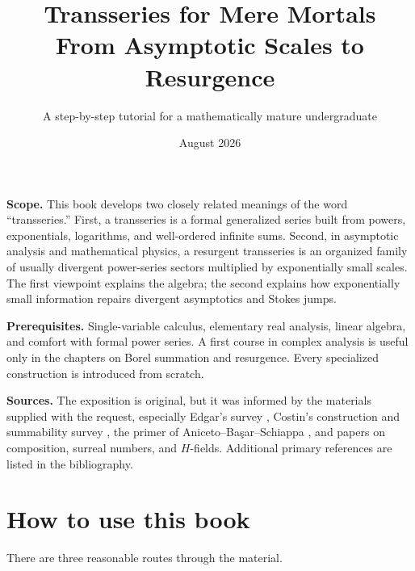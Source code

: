 \documentclass[11pt,oneside]{book}
\title{\Huge\bfseries Transseries for Mere Mortals\\[0.7em]
\Large From Asymptotic Scales to Resurgence}
\author{A step-by-step tutorial for a mathematically mature undergraduate}
\date{August 2026}
\theoremstyle{definition}
\theoremstyle{remark}
\begin{document}
\frontmatter
\hypersetup{pageanchor=false}
\maketitle
\hypersetup{pageanchor=true}

\thispagestyle{empty}
\begin{center}
\begin{minipage}{0.88\textwidth}
\small
\textbf{Scope.} This book develops two closely related meanings of the word
``transseries.'' First, a transseries is a formal generalized series built from
powers, exponentials, logarithms, and well-ordered infinite sums. Second, in
asymptotic analysis and mathematical physics, a resurgent transseries is an
organized family of usually divergent power-series sectors multiplied by
exponentially small scales. The first viewpoint explains the algebra; the second
explains how exponentially small information repairs divergent asymptotics and
Stokes jumps.

\medskip
\textbf{Prerequisites.} Single-variable calculus, elementary real analysis,
linear algebra, and comfort with formal power series. A first course in complex
analysis is useful only in the chapters on Borel summation and resurgence. Every
specialized construction is introduced from scratch.

\medskip
\textbf{Sources.} The exposition is original, but it was informed by the
materials supplied with the request, especially Edgar's survey
\cite{EdgarBeginners}, Costin's construction and summability survey
\cite{CostinTopological}, the primer of Aniceto--Ba\c{s}ar--Schiappa
\cite{AnicetoBasarSchiappa}, and papers on composition, surreal numbers, and
$H$-fields. Additional primary references are listed in the bibliography.
\end{minipage}
\end{center}
\clearpage

\chapter*{How to use this book}

There are three reasonable routes through the material.
\end{document}
